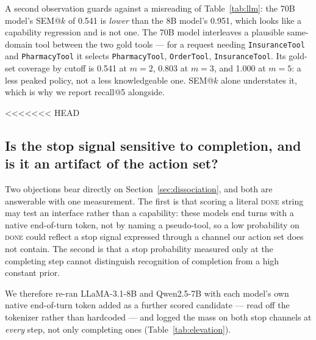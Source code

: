 \documentclass[11pt]{article}
\begin{document}
A second observation guards against a misreading of Table~\ref{tab:llm}: the 70B
model's SEM@$k$ of 0.541 is \emph{lower} than the 8B model's 0.951, which looks
like a capability regression and is not one. The 70B model interleaves a
plausible same-domain tool between the two gold tools --- for a request needing
\texttt{InsuranceTool} and \texttt{PharmacyTool} it selects
\texttt{PharmacyTool}, \texttt{OrderTool}, \texttt{InsuranceTool}. Its gold-set
coverage by cutoff is 0.541 at $m{=}2$, 0.803 at $m{=}3$, and 1.000 at $m{=}5$: a
less peaked policy, not a less knowledgeable one. SEM@$k$ alone understates it,
which is why we report recall@5 alongside.

<<<<<<< HEAD
\subsection{Is the stop signal sensitive to completion, and is it an artifact of
the action set?}
\label{sec:elevation}

Two objections bear directly on Section~\ref{sec:dissociation}, and both are
answerable with one measurement. The first is that scoring a literal
\textsc{done} string may test an interface rather than a capability: these models
end turns with a native end-of-turn token, not by naming a pseudo-tool, so a low
probability on \textsc{done} could reflect a stop signal expressed through a
channel our action set does not contain. The second is that a stop probability
measured only at the completing step cannot distinguish recognition of completion
from a high constant prior.

We therefore re-ran LLaMA-3.1-8B and Qwen2.5-7B with each model's own native
end-of-turn token added as a further scored candidate --- read off the tokenizer
rather than hardcoded --- and logged the mass on both stop channels at
\emph{every} step, not only completing ones (Table~\ref{tab:elevation}).
\end{document}
